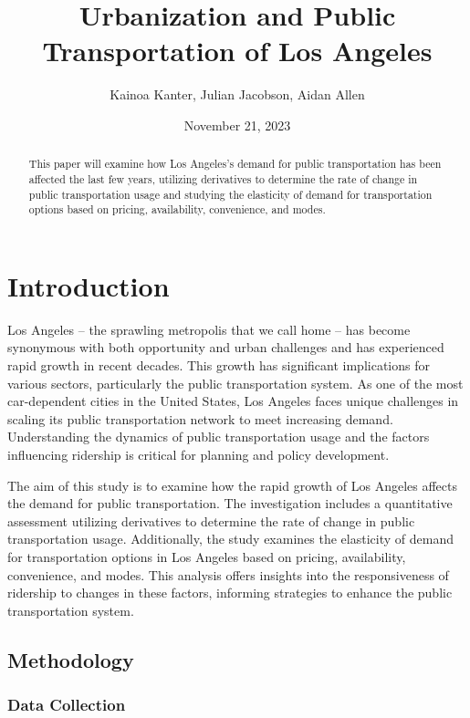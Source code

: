 \documentclass[
]{article}
\title{Urbanization and Public Transportation of Los Angeles}
\author{Kainoa Kanter, Julian Jacobson, Aidan Allen}
\date{November 21, 2023}
\begin{document}
\maketitle
\begin{abstract}
This paper will examine how Los Angeles's demand for public
transportation has been affected the last few years, utilizing
derivatives to determine the rate of change in public transportation
usage and studying the elasticity of demand for transportation options
based on pricing, availability, convenience, and modes.
\end{abstract}

\hypertarget{introduction}{%
\section{Introduction}\label{introduction}}

Los Angeles -- the sprawling metropolis that we call home -- has become
synonymous with both opportunity and urban challenges and has
experienced rapid growth in recent decades. This growth has significant
implications for various sectors, particularly the public transportation
system. As one of the most car-dependent cities in the United States,
Los Angeles faces unique challenges in scaling its public transportation
network to meet increasing demand. Understanding the dynamics of public
transportation usage and the factors influencing ridership is critical
for planning and policy development.

The aim of this study is to examine how the rapid growth of Los Angeles
affects the demand for public transportation. The investigation includes
a quantitative assessment utilizing derivatives to determine the rate of
change in public transportation usage. Additionally, the study examines
the elasticity of demand for transportation options in Los Angeles based
on pricing, availability, convenience, and modes. This analysis offers
insights into the responsiveness of ridership to changes in these
factors, informing strategies to enhance the public transportation
system.

\hypertarget{methodology}{%
\subsection{Methodology}\label{methodology}}

\hypertarget{data-collection}{%
\subsubsection{Data Collection}\label{data-collection}}
\end{document}
